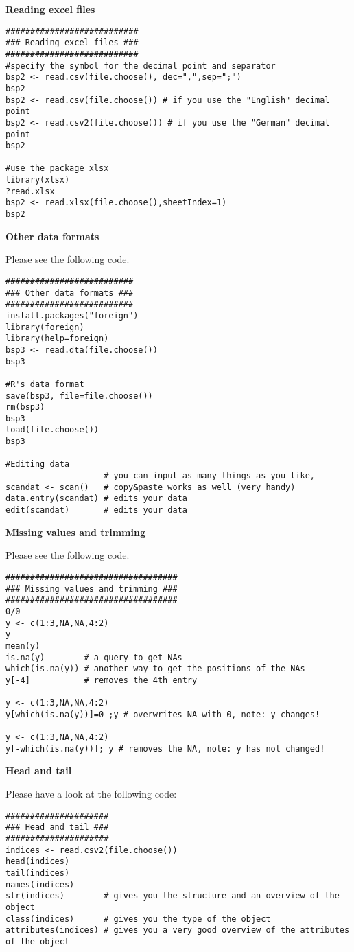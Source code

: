 \begin{Solution}{2.2}
\textbf{Reading excel files}

\begin{verbatim}
###########################
### Reading excel files ###
###########################
#specify the symbol for the decimal point and separator
bsp2 <- read.csv(file.choose(), dec=",",sep=";")
bsp2
bsp2 <- read.csv(file.choose()) # if you use the "English" decimal point
bsp2 <- read.csv2(file.choose()) # if you use the "German" decimal point
bsp2

#use the package xlsx
library(xlsx)
?read.xlsx
bsp2 <- read.xlsx(file.choose(),sheetIndex=1)
bsp2
\end{verbatim}
\end{Solution}
\begin{Solution}{2.3}
\textbf{Other data formats}

Please see the following code.
\begin{verbatim}
##########################
### Other data formats ###
##########################
install.packages("foreign")
library(foreign)
library(help=foreign)
bsp3 <- read.dta(file.choose())
bsp3

#R's data format
save(bsp3, file=file.choose())
rm(bsp3)
bsp3
load(file.choose())
bsp3

#Editing data
                    # you can input as many things as you like,
scandat <- scan()   # copy&paste works as well (very handy)
data.entry(scandat) # edits your data
edit(scandat)       # edits your data
\end{verbatim}
\end{Solution}
\begin{Solution}{2.4}
\textbf{Missing values and trimming}

Please see the following code.
\begin{verbatim}
###################################
### Missing values and trimming ###
###################################
0/0
y <- c(1:3,NA,NA,4:2)
y
mean(y)
is.na(y)        # a query to get NAs
which(is.na(y)) # another way to get the positions of the NAs
y[-4]           # removes the 4th entry

y <- c(1:3,NA,NA,4:2)
y[which(is.na(y))]=0 ;y # overwrites NA with 0, note: y changes!

y <- c(1:3,NA,NA,4:2)
y[-which(is.na(y))]; y # removes the NA, note: y has not changed!
\end{verbatim}
\end{Solution}
\begin{Solution}{3.1}
\textbf{Head and tail}

Please have a look at the following code:
\begin{verbatim}
#####################
### Head and tail ###
#####################
indices <- read.csv2(file.choose())
head(indices)
tail(indices)
names(indices)
str(indices)        # gives you the structure and an overview of the object
class(indices)      # gives you the type of the object
attributes(indices) # gives you a very good overview of the attributes of the object
\end{verbatim}
\end{Solution}
